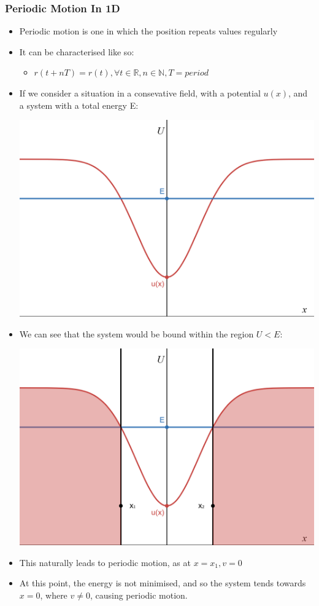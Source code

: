 \documentclass{article}
\begin{document}
\subsubsection*{Periodic Motion In 1D}

\begin{itemize}
    \item Periodic motion is one in which the position repeats values regularly
    \item It can be characterised like so:
    \begin{itemize}
        \item[] \(r(t + nT) = r(t), \forall t\in\mathbb{R}, n\in\mathbb{N}, T=period\)
    \end{itemize}
    \item If we consider a situation in a consevative field, with a potential \(u(x)\), and a system with a total energy E:

    \includegraphics[width = 0.5\linewidth]{year1/wfmp/periodic-motion/potential-without-bounds.png}

    \item We can see that the system would be bound within the region $U < E$: 

    \includegraphics[width = 0.5\linewidth]{year1/wfmp/periodic-motion/potential-with-bounds.png}

    \item This naturally leads to periodic motion, as at \(x = x_1, v = 0\)
    \item At this point, the energy is not minimised, and so the system tends towards \(x = 0\), 
    where \(v \not= 0\), causing periodic motion. 
    

\end{itemize}
\end{document}
